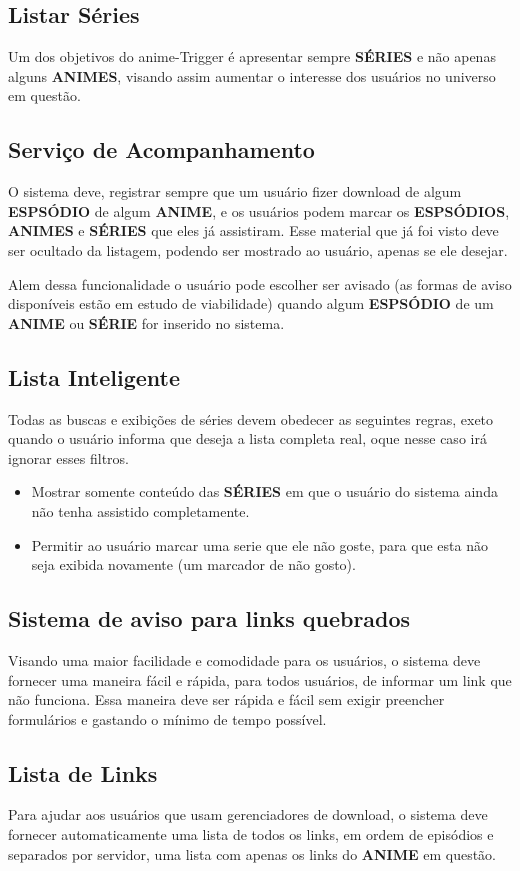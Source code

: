 \documentclass{abnt}
\begin{document}
\subsection{Listar Séries}
Um dos objetivos do anime-Trigger é apresentar sempre \textbf{SÉRIES} e não apenas alguns \textbf{ANIMES}, visando assim aumentar o interesse dos usuários no universo em questão.
\par
\subsection{Serviço de Acompanhamento}
O sistema deve, registrar sempre que um usuário fizer download de algum \textbf{ESPSÓDIO} de algum \textbf{ANIME}, e os usuários podem marcar os \textbf{ESPSÓDIOS}, \textbf{ANIMES} e \textbf{SÉRIES} que eles já assistiram. Esse material que já foi visto deve ser ocultado da listagem, podendo ser mostrado ao usuário, apenas se ele desejar.
\par
Alem dessa funcionalidade o usuário pode escolher ser avisado (as formas de aviso disponíveis estão em estudo de viabilidade) quando algum \textbf{ESPSÓDIO} de um \textbf{ANIME} ou \textbf{SÉRIE} for inserido no sistema.
\subsection{Lista Inteligente}
Todas as buscas e exibições de séries devem obedecer as seguintes regras, exeto quando o usuário informa que deseja a lista completa real, oque nesse caso irá ignorar esses filtros.
\begin{itemize}
	\item Mostrar somente conteúdo das \textbf{SÉRIES} em que o usuário do sistema ainda não tenha assistido completamente.
	\item Permitir ao usuário marcar uma serie que ele não goste, para que esta não seja exibida novamente (um marcador de não gosto).
\end{itemize}
\subsection{Sistema de aviso para links quebrados}
\par
Visando uma maior facilidade e comodidade para os usuários, o sistema deve fornecer uma maneira fácil e rápida, para todos usuários, de informar um link que não funciona. Essa maneira deve ser rápida e fácil sem exigir preencher formulários e gastando o mínimo de tempo possível.
\subsection{Lista de Links}
\par
Para ajudar aos usuários que usam gerenciadores de download, o sistema deve fornecer automaticamente uma lista de todos os links, em ordem de episódios e separados por servidor, uma lista com apenas os links do \textbf{ANIME} em questão.
\end{document}
